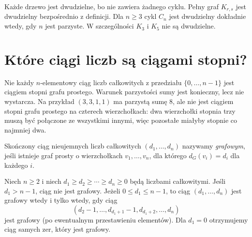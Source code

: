 \begin{center}
\end{center}

\begin{przyklad}
Każde drzewo jest dwudzielne, bo nie zawiera żadnego
cyklu. Pełny graf $K_{r,s}$ jest dwudzielny bezpośrednio
z definicji. Dla $n\ge3$ cykl $C_n$ jest dwudzielny
dokładnie wtedy, gdy $n$ jest parzyste. W szczególności
$K_3$ i $K_5$ nie są dwudzielne.
\end{przyklad}

\section{Które ciągi liczb są ciągami stopni?}
\label{sec:tg-havel}

Nie każdy $n$-elementowy ciąg liczb całkowitych z przedziału
$\{0,\ldots,n-1\}$ jest ciągiem stopni grafu prostego.
Warunek parzystości sumy jest konieczny, lecz nie wystarcza.
Na przykład $(3,3,1,1)$ ma parzystą sumę $8$, ale nie jest
ciągiem stopni grafu prostego na czterech wierzchołkach:
dwa wierzchołki stopnia trzy muszą być połączone ze wszystkimi
innymi, więc pozostałe miałyby stopnie co najmniej dwa.

\begin{definicja}
Skończony ciąg nieujemnych liczb całkowitych
$(d_1,\ldots,d_n)$ nazywamy \emph{grafowym},
jeśli istnieje graf prosty o wierzchołkach
$v_1,\ldots,v_n$, dla którego $d_G(v_i)=d_i$
dla każdego $i$.
\end{definicja}

\begin{twierdzenie}
Niech $n\ge2$ i niech
$d_1\ge d_2\ge\cdots\ge d_n\ge0$ będą liczbami
całkowitymi. Jeśli $d_1>n-1$, ciąg nie jest grafowy.
Jeżeli $0\le d_1\le n-1$, to ciąg
$(d_1,\ldots,d_n)$ jest grafowy wtedy i tylko
wtedy, gdy ciąg
\[
(d_2-1,\ldots,d_{d_1+1}-1,
  d_{d_1+2},\ldots,d_n)
\]
jest grafowy (po ewentualnym przestawieniu elementów).
Dla $d_1=0$ otrzymujemy ciąg samych zer, który jest
grafowy.
\end{twierdzenie}

